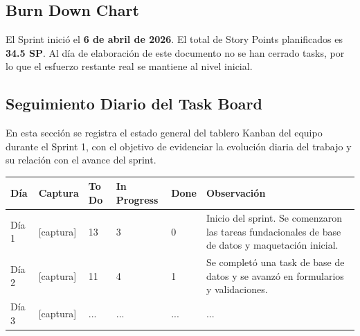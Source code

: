 \documentclass[12pt,a4paper]{article}
\begin{document}
\subsection{Burn Down Chart}

El Sprint inició el \textbf{6 de abril de 2026}. El total de Story Points planificados es \textbf{34.5 SP}. Al día de elaboración de este documento no se han cerrado tasks, por lo que el esfuerzo restante real se mantiene al nivel inicial.

\vspace{1em}

\begin{center}
\end{center}

\subsection{Seguimiento Diario del Task Board}

En esta sección se registra el estado general del tablero Kanban del equipo
durante el Sprint 1, con el objetivo de evidenciar la evolución diaria del
trabajo y su relación con el avance del sprint.

\begin{longtable}{|p{1.5cm}|p{3cm}|p{1.5cm}|p{2cm}|p{1.5cm}|p{3cm}|}
\hline
\textbf{Día} & \textbf{Captura} & \textbf{To Do} & \textbf{In Progress} & \textbf{Done} & \textbf{Observación} \\
\hline
Día 1 & {[captura]} & 13 & 3 & 0 & Inicio del sprint. Se comenzaron las tareas fundacionales de base de datos y maquetación inicial. \\
\hline
Día 2 & {[captura]} & 11 & 4 & 1 & Se completó una task de base de datos y se avanzó en formularios y validaciones. \\
\hline
Día 3 & {[captura]} & ... & ... & ... & ... \\
\hline
\end{longtable}
\end{document}
